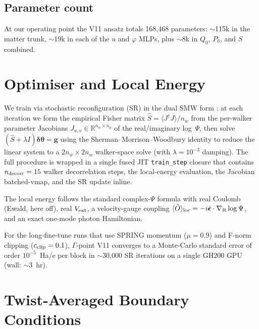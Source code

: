 \documentclass[reprint,amsmath,amssymb,aps,prb,floatfix,nofootinbib]{revtex4-2}
\begin{document}
\subsection{Parameter count}
At our operating point the V11 ansatz totals 168{,}468
parameters: $\sim$115k in the matter trunk, $\sim$19k in each of the
$u$ and $\varphi$ MLPs, plus $\sim$8k in $Q_0$, $P_0$, and $S$
combined.

\section{Optimiser and Local Energy}\label{sec:optimizer}
We train via stochastic reconfiguration (SR) in the dual SMW form
\cite{Park2024}: at each iteration we form the empirical Fisher
matrix $\hat S = \langle J^\dagger J\rangle / n_w$ from the per-walker
parameter Jacobians $J_{u,v} \in \mathbb{R}^{n_w \times n_p}$ of the
real/imaginary log~$\Psi$, then solve
$(\hat S + \lambda I) \bm{\delta\theta} = \mathbf{g}$ using the
Sherman--Morrison--Woodbury identity to reduce the linear system to
a $2n_w \times 2n_w$ walker-space solve (with $\lambda = 10^{-3}$
damping).  The full procedure is wrapped in a single fused JIT
\texttt{train\_step} closure that contains $n_{\rm decorr} = 15$
walker decorrelation steps, the local-energy evaluation, the Jacobian
batched-vmap, and the SR update inline.

The local energy follows the standard complex-$\Psi$ formula with
real Coulomb (Ewald, here off), real $V_{\rm ext}$, a velocity-gauge
coupling
$\langle \hat O \rangle_{\rm loc} = -i \hat{\bm\epsilon}\cdot
\nabla_{\rm R} \log \Psi$, and an exact one-mode photon
Hamiltonian.

For the long-fine-tune runs that use SPRING momentum ($\mu=0.9$)
\cite{Goldshlager2024} and F-norm clipping ($c_{\rm clip} = 0.1$),
$\Gamma$-point V11 converges to a Monte-Carlo standard error of
order $10^{-5}$~Ha/e per block in $\sim$30{,}000 SR iterations on a
single GH200 GPU (wall: $\sim$3~hr).

\section{Twist-Averaged Boundary Conditions}\label{sec:tabc}
\end{document}
